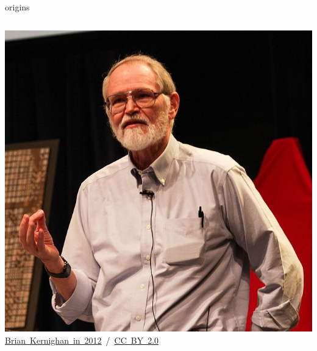 \documentclass[10pt,t,usenames,dvipsnames]{beamer}
\begin{document}
\begin{frame}{origins}
\begin{columns}
\begin{column}{.51725\textwidth}
        \includegraphics[width=\textwidth]{Brian_Kernighan_in_2012.jpg}\\
        \hfill \tiny{\href{https://en.wikipedia.org/wiki/Brian\_Kernighan\#/media/File:Brian\_Kernighan\_in\_2012\_at\_Bell\_Labs\_1.jpg}{Brian~Kernighan~in~2012}~/~\href{http://creativecommons.org/licenses/by-sa/2.0}{CC~BY~2.0}}
      \end{column}
    \end{columns}
  \end{frame}
  
\end{document}
